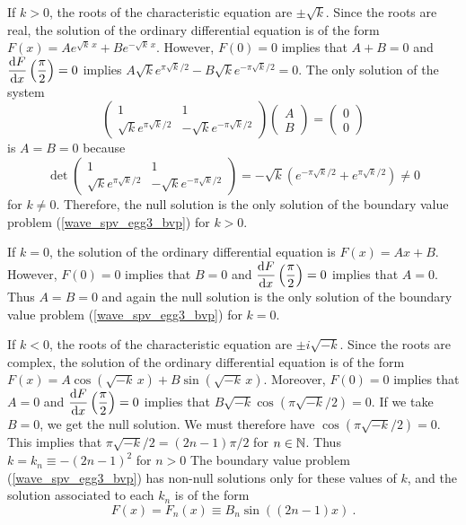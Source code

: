 \begin{egg}
If $k>0$, the roots of the characteristic equation are $\pm \sqrt{k}$.
Since the roots are real, the solution of the ordinary differential
equation is of the form
$\displaystyle F(x) = A e^{\sqrt{k}\,x} + B e^{-\sqrt{k}\, x}$.
However, $F(0)=0$ implies that $A+B=0$ and
$\displaystyle \frac{\mathrm{d}F}{\mathrm{d}{x}}\left(\frac{\pi}{2}\right)=0$ implies
$\displaystyle A\sqrt{k} e^{\pi\sqrt{k}/2} - B\sqrt{k} e^{-\pi\sqrt{k}/2} = 0$.
The only solution of the system
\[
\begin{pmatrix}
1 & 1 \\ \sqrt{k} e^{\pi\sqrt{k}/2} & -\sqrt{k} e^{-\pi\sqrt{k}/2}
\end{pmatrix}
\begin{pmatrix}
A \\ B
\end{pmatrix}
=
\begin{pmatrix}
0 \\ 0 
\end{pmatrix}
\]
is $A=B=0$ because
\[
\det
\begin{pmatrix}
1 & 1 \\ \sqrt{k} e^{\pi\sqrt{k}/2} & -\sqrt{k} e^{-\pi\sqrt{k}/2}
\end{pmatrix}
= -\sqrt{k} \left(e^{-\pi\sqrt{k}/2} + e^{\pi\sqrt{k}/2}\right) 
\neq 0
\]
for $k\neq 0$.  Therefore, the null solution is the only solution
of the boundary value problem (\ref{wave_spv_egg3_bvp}) for $k>0$.

If $k=0$, the solution of the ordinary differential equation is $F(x)=Ax+B$.
However, $F(0)=0$ implies that $B=0$ and
$\displaystyle \frac{\mathrm{d}F}{\mathrm{d}{x}}\left(\frac{\pi}{2}\right)=0$ implies
that $A = 0$.  Thus $A=B=0$ and again the null solution is the
only solution of the boundary value problem (\ref{wave_spv_egg3_bvp})
for $k=0$.

If $k<0$, the roots of the characteristic equation are $\pm i \sqrt{-k}$.
Since the roots are complex, the solution of the ordinary differential
equation is of the form $\displaystyle
F(x) = A \cos\left(\sqrt{-k}\,x\right) + B \sin\left(\sqrt{-k}\,x\right)$.
Moreover, $F(0)=0$ implies that $A=0$ and
$\displaystyle \frac{\mathrm{d}F}{\mathrm{d}{x}}\left(\frac{\pi}{2}\right)=0$ implies that
$B \sqrt{-k} \cos\left(\pi\sqrt{-k}/2\right) = 0$.  If we take
$B=0$, we get the null solution.  We must therefore have
$\cos\left(\pi\sqrt{-k}/2\right) = 0$.  This implies that
$\displaystyle \pi \sqrt{-k}/2 = (2n-1)\pi/2$ for
$n\in \mathbb{N}$. Thus $\displaystyle k = k_n \equiv -(2n-1)^2$
for $n>0$  The boundary value problem (\ref{wave_spv_egg3_bvp}) has
non-null solutions only for these values of $k$, and the solution
associated to each $k_n$ is of the form 
\[
F(x)=F_n(x) \equiv B_n \sin\left((2n-1)x\right) \ .
\]


\end{egg}
